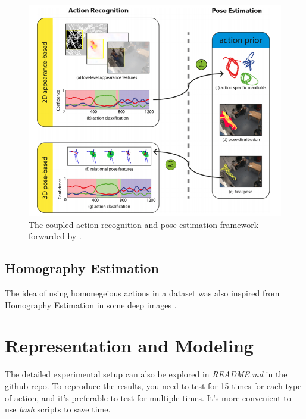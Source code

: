 \documentclass[10pt,twocolumn,letterpaper]{article}
\begin{document}
\begin{figure}[H]
	\begin{center}
  		\includegraphics[width=0.9\linewidth]{action_and_pose.png}
	\end{center}
   	\caption{The coupled action recognition and pose estimation framework forwarded by \cite{yao2012coupled}.}
	\label{fig:long}
	\label{fig:onecol}
\end{figure}


\subsection{Homography Estimation}

The idea of using homonegeious actions in a dataset was also inspired from Homography Estimation
in some deep images \cite{detone2016deep}.



\section{Representation and Modeling}
 
The detailed experimental setup can also be explored in \textit{README.md} in the github repo. To reproduce
the results, you need to test for 15 times for each type of action, and it's preferable to test for multiple
times. It's more convenient to use \textit{bash} scripts to save time.
\end{document}
